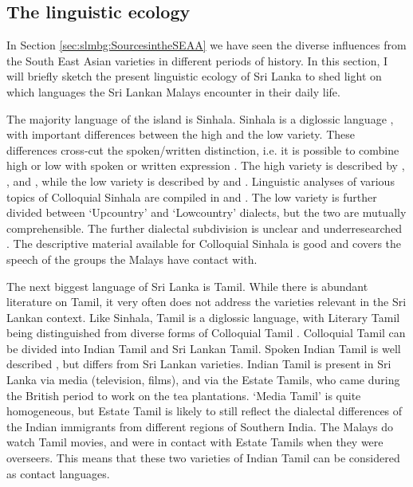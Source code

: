  

\subsection{The linguistic ecology}
In Section \ref{sec:slmbg:SourcesintheSEAA} we have seen the diverse influences from the South East Asian varieties in different periods of history. In this section, I will briefly sketch the present linguistic ecology of Sri Lanka to shed light on which languages the Sri Lankan Malays encounter in their daily life.

The majority language of the island is Sinhala. Sinhala is a diglossic language \citep{Gair1968,
Gair1985diglossia,
Paolillo1992,
Paolillo1997},
with important differences between the high and the low variety. These differences cross-cut the spoken/written distinction, i.e. it is possible to combine high or low with spoken or written expression \citep{DeSilva1974,Gair1985diglossia,Paolillo1997}. The high variety is described by
\citet{Gunasekara1891},
\citet{Geiger1938,
Geiger1973},
and \citet{GairEtAl1974literary},
while the low variety is described by
\citet{Chater1815,
FairbanksEtAl1968,
Matzel1983,
GairEtAl1997,
Dissanayaka2003,
Jayawardena2004}
and \citet{Karunatillake2004}.
Linguistic analyses of various topics of Colloquial Sinhala are compiled in \citet{Gair1998} and \citet{Henadeerage2002}. The low variety is further divided between `Upcountry' and `Lowcountry' dialects, but the two are mutually comprehensible. The further dialectal subdivision is unclear and underresearched \citep[xii]{Jayawardena1996}. The descriptive material available for Colloquial Sinhala is  good and covers the speech of the groups the Malays have contact with.

The next biggest language of Sri Lanka is Tamil. While there is abundant literature on Tamil, it very often does not address the varieties relevant in the Sri Lankan context. Like Sinhala, Tamil is a diglossic language, with Literary Tamil being distinguished from diverse forms of Colloquial Tamil \citep{AnnamalaiEtAl1998}.  Colloquial Tamil can be divided into Indian Tamil and Sri Lankan Tamil. Spoken Indian Tamil is well described
\citep{Pope1867,
Arden1934,
Beythan1943,
Asher1982,
Lehmann1989,
Schiffman1999,
AsherEtAl2002,
AnnamalaiEtAl1998},
but differs from Sri Lankan varieties. Indian Tamil is present in Sri Lanka via media (television, films), and via the Estate Tamils, who came during the British period to work on the tea plantations. `Media Tamil' is quite homogeneous, but Estate Tamil is likely to still reflect the dialectal differences of the Indian immigrants from different regions of Southern India. The Malays do watch Tamil movies, and were in contact with Estate Tamils when they were overseers. This means that these two varieties of Indian Tamil can be considered as contact languages.

